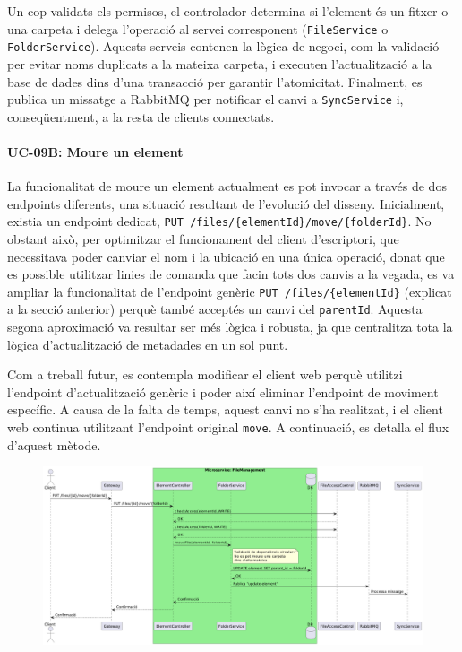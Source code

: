 Un cop validats els permisos, el controlador determina si l'element és un fitxer o una carpeta i delega l'operació al servei corresponent (\texttt{FileService} o \texttt{FolderService}). Aquests serveis contenen la lògica de negoci, com la validació per evitar noms duplicats a la mateixa carpeta, i executen l'actualització a la base de dades dins d'una transacció per garantir l'atomicitat. Finalment, es publica un missatge a RabbitMQ per notificar el canvi a \texttt{SyncService} i, conseqüentment, a la resta de clients connectats.

\paragraph{UC-09B: Moure un element} La funcionalitat de moure un element actualment es pot invocar a través de dos endpoints diferents, una situació resultant de l'evolució del disseny. Inicialment, existia un endpoint dedicat, \texttt{PUT /files/\{elementId\}/move/\{folderId\}}. No obstant això, per optimitzar el funcionament del client d'escriptori, que necessitava poder canviar el nom i la ubicació en una única operació, donat que es possible utilitzar linies de comanda que facin tots dos canvis a la vegada, es va ampliar la funcionalitat de l'endpoint genèric \texttt{PUT /files/\{elementId\}} (explicat a la secció anterior) perquè també acceptés un canvi del \texttt{parentId}. Aquesta segona aproximació va resultar ser més lògica i robusta, ja que centralitza tota la lògica d'actualització de metadades en un sol punt.

Com a treball futur, es contempla modificar el client web perquè utilitzi l'endpoint d'actualització genèric i poder així eliminar l'endpoint de moviment específic. A causa de la falta de temps, aquest canvi no s'ha realitzat, i el client web continua utilitzant l'endpoint original \texttt{move}. A continuació, es detalla el flux d'aquest mètode.

\begin{figure}[H]
    \centering
    \includegraphics[width=\textwidth]{Figures/flux/move_files.png}
\end{figure}

